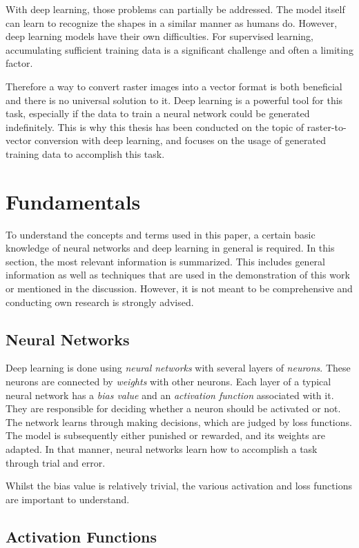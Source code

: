\documentclass[12pt, a4paper, titlepage]{report}
\begin{document}
With deep learning, those problems can partially be addressed. The model itself can learn to recognize the shapes in a similar manner as humans do.
However, deep learning models have their own difficulties. For supervised learning, accumulating sufficient training data is a significant challenge and often a limiting factor.

Therefore a way to convert raster images into a vector format is both beneficial and there is no universal solution to it. Deep learning is a powerful tool for this task, especially if the data to train a neural network could be generated indefinitely.
This is why this thesis has been conducted on the topic of raster-to-vector conversion with deep learning, and focuses on the usage of generated training data to accomplish this task.


\section{Fundamentals}

To understand the concepts and terms used in this paper, a certain basic knowledge of neural networks and deep learning in general is required. In this section, the most relevant information is summarized. This includes general information as well as techniques that are used in the demonstration of this work or mentioned in the discussion. However, it is not meant to be comprehensive and conducting own research is strongly advised.

\subsection{Neural Networks}

Deep learning is done using \emph{neural networks} with several layers of \emph{neurons}. These neurons are connected by \emph{weights} with other neurons.
Each layer of a typical neural network has a \emph{bias value} and an \emph{activation function} associated with it. They are responsible for deciding whether a neuron should be activated or not. The network learns through making decisions, which are judged by loss functions. The model is subsequently either punished or rewarded, and its weights are adapted. In that manner, neural networks learn how to accomplish a task through trial and error.

Whilst the bias value is relatively trivial, the various activation and loss functions are important to understand.

\subsection{Activation Functions}
\end{document}
